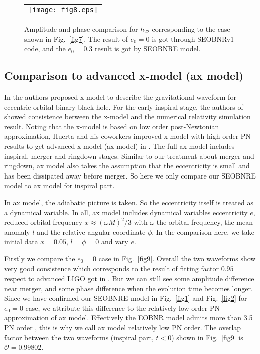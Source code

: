 \documentclass[prd,aps,a4paper,superscriptaddress,twocolumn,footinbib,showpacs]{revtex4}
\begin{document}
\begin{figure*}
\begin{tabular}{c}
\texttt{[image: fig8.eps]}
\end{tabular}
\caption{Amplitude and phase comparison for $h_{22}$ corresponding to the case shown in Fig.~\ref{fig7}. The result of $e_0=0$ is got through SEOBNRv1 code, and the $e_0=0.3$ result is got by SEOBNRE model.}\label{fig8}
\end{figure*}

\subsection{Comparison to advanced x-model (ax model)}
In \cite{PhysRevD.82.024033} the authors proposed x-model to describe the gravitational waveform for eccentric orbital binary black hole. For the early inspiral stage, the authors of \cite{PhysRevD.82.024033} showed consistence between the x-model and the numerical relativity simulation result. Noting that the x-model is based on low order post-Newtonian approximation, Huerta and his coworkers improved x-model with high order PN results to get advanced x-model (ax model) in \cite{PhysRevD.95.024038}. The full ax model includes inspiral, merger and ringdown stages. Similar to our treatment about merger and ringdown, ax model also takes the assumption that the eccentricity is small and has been dissipated away before merger. So here we only compare our SEOBNRE model to ax model for inspiral part.

In ax model, the adiabatic picture is taken. So the eccentricity itself is treated as a dynamical variable. In all, ax model includes dynamical variables eccentricity $e$, reduced orbital frequency $x\approx(\omega M)^2/3$ with $\omega$ the orbital frequency, the mean anomaly $l$ and the relative angular coordinate $\phi$. In the comparison here, we take initial data $x=0.05$, $l=\phi=0$ and vary $e$.

Firstly we compare the $e_0=0$ case in Fig.~\ref{fig9}. Overall the two waveforms show very good consistence which corresponds to the result of fitting factor $0.95$ respect to advanced LIGO got in \cite{PhysRevD.95.024038}. But we can still see some amplitude difference near merger, and some phase difference when the evolution time becomes longer. Since we have confirmed our SEOBNRE model in Fig.~\ref{fig1} and Fig.~\ref{fig2} for $e_0=0$ case, we attribute this difference to the relatively low order PN approximation of ax model. Effectively the EOBNR model admits more than 3.5 PN order \cite{PhysRevD.76.104049,messina2017back}, this is why we call ax model relatively low PN order. The overlap factor between the two waveforms (inspiral part, $t<0$) shown in Fig.~\ref{fig9} is $\mathcal{O}=0.99802$.
\end{document}
